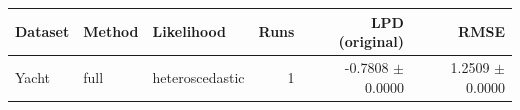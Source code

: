 \begin{tabular}{lllrrr}
\toprule
Dataset & Method & Likelihood & Runs & LPD (original) & RMSE \\
\midrule
Yacht & full & heteroscedastic & 1 & -0.7808 $\pm$ 0.0000 & 1.2509 $\pm$ 0.0000 \\
\bottomrule
\end{tabular}
